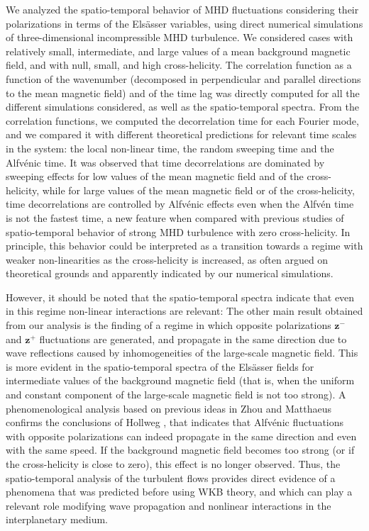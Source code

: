 \documentclass[aip,pop,reprint,amsmath,amssymb,floatfix]{revtex4-1}
\renewcommand{\vec}[1]{\mathbf{#1}}
\begin{document}
We analyzed the spatio-temporal behavior of MHD fluctuations
considering their polarizations in terms of the Els\"asser variables,
using direct numerical simulations of three-dimensional incompressible
MHD turbulence. We considered cases with relatively small,
intermediate, and large values of a mean background magnetic field,
and with null, small, and high cross-helicity. The correlation
function as a function of the wavenumber (decomposed in perpendicular
and parallel directions to the mean magnetic field) and of the time
lag was directly computed for all the different simulations
considered, as well as the spatio-temporal spectra. From the
correlation functions, we computed the decorrelation time for each
Fourier mode, and we compared it with different theoretical
predictions for relevant time scales in the system: the local
non-linear time, the random sweeping time and the Alfv\'enic time. It
was observed that time decorrelations are dominated by sweeping
effects for low values of the mean magnetic field and of the
cross-helicity, while for large values of the mean magnetic field or
of the cross-helicity, time decorrelations are controlled by
Alfv\'enic effects even when the Alfv\'en time is not the fastest
time, a new feature when compared with previous studies of
spatio-temporal behavior of strong MHD turbulence with zero
cross-helicity. In principle, this behavior could be interpreted as a
transition towards a regime with weaker non-linearities as the
cross-helicity is increased, as often argued on theoretical grounds
and apparently indicated by our numerical simulations.

However, it should be noted that the spatio-temporal spectra indicate
that even in this regime non-linear interactions are relevant: The
other main result obtained from our analysis is the finding of a
regime in which opposite polarizations $\vec{z}^-$ and $\vec{z}^+$
fluctuations are generated, and propagate in the same direction due to
wave reflections caused by inhomogeneities of the large-scale magnetic
field. This is more evident in the spatio-temporal spectra of the
Els\"asser fields for intermediate values of the background magnetic
field (that is, when the uniform and constant component of the
large-scale magnetic field is not too strong). A phenomenological
analysis based on previous ideas in Zhou and Matthaeus
\cite{zhou1990remarks} confirms the conclusions of Hollweg 
\cite{hollweg_1990_wkb}, that indicates that Alfv\'enic fluctuations with
opposite polarizations can indeed propagate in the same direction and
even with the same speed. If the background magnetic field becomes too
strong (or if the cross-helicity is close to zero), this effect is no
longer observed. Thus, the spatio-temporal analysis of the turbulent
flows provides direct evidence of a phenomena that was predicted before 
using WKB theory, and which can play a relevant role modifying wave 
propagation and nonlinear interactions in the interplanetary medium.
\end{document}
